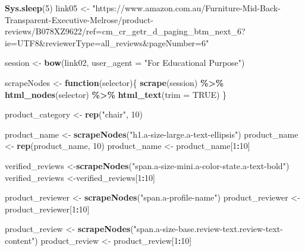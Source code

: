 \documentclass[
]{article}
\newenvironment{Shaded}{\begin{snugshade}}{\end{snugshade}}
\newcommand{\AttributeTok}[1]{\textcolor[rgb]{0.13,0.29,0.53}{#1}}
\newcommand{\ConstantTok}[1]{\textcolor[rgb]{0.56,0.35,0.01}{#1}}
\newcommand{\ControlFlowTok}[1]{\textcolor[rgb]{0.13,0.29,0.53}{\textbf{#1}}}
\newcommand{\DecValTok}[1]{\textcolor[rgb]{0.00,0.00,0.81}{#1}}
\newcommand{\FunctionTok}[1]{\textcolor[rgb]{0.13,0.29,0.53}{\textbf{#1}}}
\newcommand{\NormalTok}[1]{#1}
\newcommand{\OtherTok}[1]{\textcolor[rgb]{0.56,0.35,0.01}{#1}}
\newcommand{\SpecialCharTok}[1]{\textcolor[rgb]{0.81,0.36,0.00}{\textbf{#1}}}
\newcommand{\StringTok}[1]{\textcolor[rgb]{0.31,0.60,0.02}{#1}}
\begin{document}
\begin{Shaded}
\begin{Highlighting}[]
   \FunctionTok{Sys.sleep}\NormalTok{(}\DecValTok{5}\NormalTok{)}
\NormalTok{link05 }\OtherTok{\textless{}{-}} \StringTok{"https://www.amazon.com.au/Furniture{-}Mid{-}Back{-}Transparent{-}Executive{-}Melrose/product{-}reviews/B078XZ9622/ref=cm\_cr\_getr\_d\_paging\_btm\_next\_6?ie=UTF8\&reviewerType=all\_reviews\&pageNumber=6"}


\NormalTok{  session }\OtherTok{\textless{}{-}} \FunctionTok{bow}\NormalTok{(link02,}
               \AttributeTok{user\_agent =} \StringTok{"For Educational Purpose"}\NormalTok{)}

\NormalTok{  scrapeNodes }\OtherTok{\textless{}{-}} \ControlFlowTok{function}\NormalTok{(selector)\{}
    \FunctionTok{scrape}\NormalTok{(session) }\SpecialCharTok{\%\textgreater{}\%}
      \FunctionTok{html\_nodes}\NormalTok{(selector) }\SpecialCharTok{\%\textgreater{}\%}
      \FunctionTok{html\_text}\NormalTok{(}\AttributeTok{trim =} \ConstantTok{TRUE}\NormalTok{)}
\NormalTok{  \}}

\NormalTok{  product\_category }\OtherTok{\textless{}{-}} \FunctionTok{rep}\NormalTok{(}\StringTok{"chair"}\NormalTok{, }\DecValTok{10}\NormalTok{)}

\NormalTok{  product\_name }\OtherTok{\textless{}{-}} \FunctionTok{scrapeNodes}\NormalTok{(}\StringTok{"h1.a{-}size{-}large.a{-}text{-}ellipsis"}\NormalTok{)}
\NormalTok{  product\_name }\OtherTok{\textless{}{-}} \FunctionTok{rep}\NormalTok{(product\_name, }\DecValTok{10}\NormalTok{)}
\NormalTok{  product\_name }\OtherTok{\textless{}{-}}\NormalTok{ product\_name[}\DecValTok{1}\SpecialCharTok{:}\DecValTok{10}\NormalTok{]}
  
\NormalTok{  verified\_reviews }\OtherTok{\textless{}{-}}\FunctionTok{scrapeNodes}\NormalTok{(}\StringTok{"span.a{-}size{-}mini.a{-}color{-}state.a{-}text{-}bold"}\NormalTok{)}
\NormalTok{  verified\_reviews }\OtherTok{\textless{}{-}}\NormalTok{verified\_reviews[}\DecValTok{1}\SpecialCharTok{:}\DecValTok{10}\NormalTok{]}
  
\NormalTok{  product\_reviewer }\OtherTok{\textless{}{-}} \FunctionTok{scrapeNodes}\NormalTok{(}\StringTok{"span.a{-}profile{-}name"}\NormalTok{)}
\NormalTok{  product\_reviewer }\OtherTok{\textless{}{-}}\NormalTok{ product\_reviewer[}\DecValTok{1}\SpecialCharTok{:}\DecValTok{10}\NormalTok{]}
  
\NormalTok{  product\_review }\OtherTok{\textless{}{-}} \FunctionTok{scrapeNodes}\NormalTok{(}\StringTok{"span.a{-}size{-}base.review{-}text.review{-}text{-}content"}\NormalTok{)}
\NormalTok{  product\_review }\OtherTok{\textless{}{-}}\NormalTok{ product\_review[}\DecValTok{1}\SpecialCharTok{:}\DecValTok{10}\NormalTok{]}
  

\end{Highlighting}
\end{Shaded}
\end{document}
